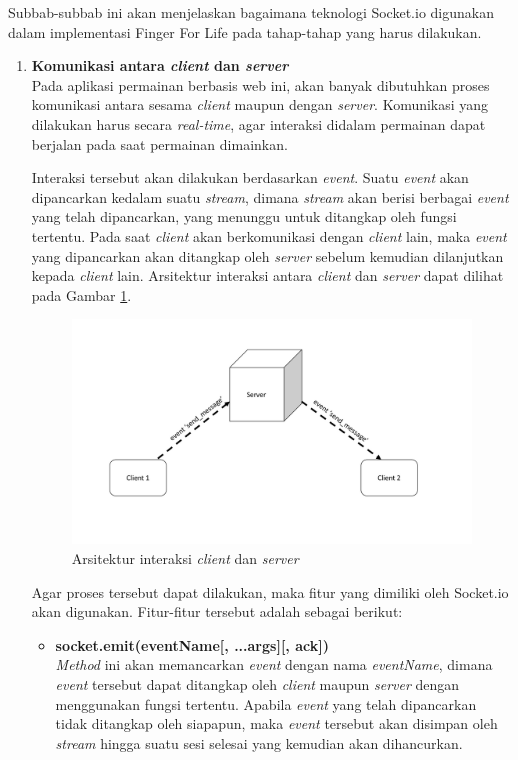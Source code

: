Subbab-subbab ini akan menjelaskan bagaimana teknologi Socket.io digunakan dalam implementasi Finger For Life pada tahap-tahap yang harus dilakukan.
\begin{enumerate}
	\item \textbf{Komunikasi antara \textit{client} dan \textit{server}} \\
	Pada aplikasi permainan berbasis web ini, akan banyak dibutuhkan proses komunikasi antara sesama \textit{client} maupun dengan \textit{server}. Komunikasi yang dilakukan harus secara \textit{real-time}, agar interaksi didalam permainan dapat berjalan pada saat permainan dimainkan.
	
	Interaksi tersebut akan dilakukan berdasarkan \textit{event}. Suatu \textit{event} akan dipancarkan kedalam suatu \textit{stream}, dimana \textit{stream} akan berisi berbagai \textit{event} yang telah dipancarkan, yang menunggu untuk ditangkap oleh fungsi tertentu. Pada saat \textit{client} akan berkomunikasi dengan \textit{client} lain, maka \textit{event} yang dipancarkan akan ditangkap oleh \textit{server} sebelum kemudian dilanjutkan kepada \textit{client} lain. Arsitektur interaksi antara \textit{client} dan \textit{server} dapat dilihat pada Gambar \ref{fig:ars_socketio}.
\begin{figure}[H]
	\centering
	\includegraphics[scale=0.2]{Gambar/ars_socketio}
	\caption{Arsitektur interaksi \textit{client} dan \textit{server}}
	\label{fig:ars_socketio}
\end{figure}	
	Agar proses tersebut dapat dilakukan, maka fitur yang dimiliki oleh Socket.io akan digunakan. Fitur-fitur tersebut adalah sebagai berikut:
	
	\begin{itemize}
		\item \textbf{socket.emit(eventName[, ...args][, ack])} \\ 
		\textit{Method} ini akan memancarkan \textit{event} dengan nama \textit{eventName}, dimana \textit{event} tersebut dapat ditangkap oleh \textit{client} maupun \textit{server} dengan menggunakan fungsi tertentu. Apabila \textit{event} yang telah dipancarkan tidak ditangkap oleh siapapun, maka \textit{event} tersebut akan disimpan oleh \textit{stream} hingga suatu sesi selesai yang kemudian akan dihancurkan.
		

\end{itemize}
\end{enumerate}
